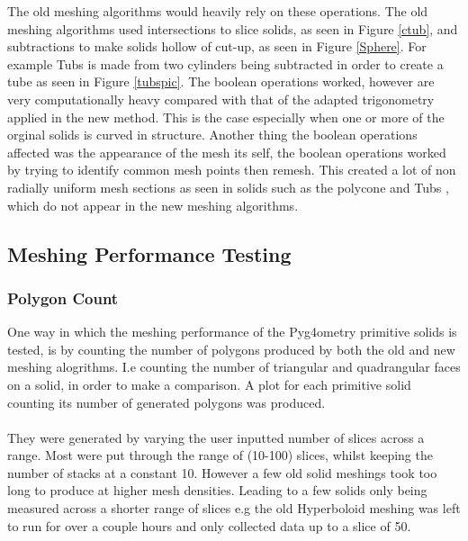 \documentclass[12pt,a4paper]{article}
\begin{document}
\noindent The old meshing algorithms would heavily rely on these operations. The old meshing algorithms used intersections to slice solids, as seen in Figure \ref{ctub}, and subtractions to make solids hollow of cut-up, as seen in Figure \ref{Sphere}. For example Tubs is made from two cylinders being subtracted in order to create a tube as seen in Figure \ref{tubspic}. The boolean operations worked, however are very computationally heavy compared with that of the adapted trigonometry applied in the new method. This is the case especially when one or more of the orginal solids is curved in structure. Another thing the boolean operations affected was the appearance of the mesh its self, the boolean operations worked by trying to identify common mesh points then remesh. This created a lot of non radially uniform mesh sections as seen in solids such as the polycone and Tubs , which do not appear in the new meshing algorithms.\\



\newpage
\subsection{Meshing Performance Testing}
\subsubsection{Polygon Count}
One way in which the meshing performance of the Pyg4ometry primitive solids is tested, is by counting the number of polygons produced by both the old and new meshing alogrithms. I.e counting the number of triangular and quadrangular faces on a solid, in order to make a comparison. A plot for each primitive solid counting its number of generated polygons was produced.
\\\\
They were generated by varying the user inputted number of slices across a range. Most were put through the range of (10-100) slices, whilst keeping the number of stacks at a constant 10. However a few old solid meshings took too long to produce at higher mesh densities. Leading to a few solids only being measured across a shorter range of slices e.g the old Hyperboloid meshing was left to run for over a couple hours and only collected data up to a slice of 50.  \\
\end{document}
